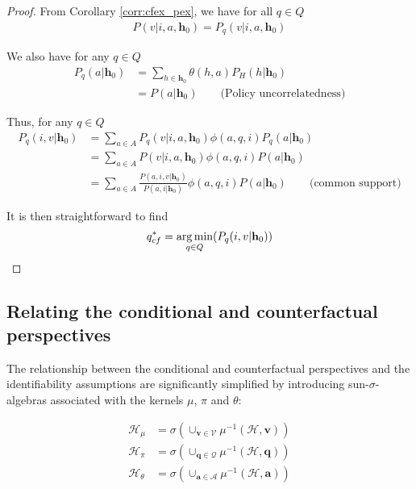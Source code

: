 \begin{proof}

From Corollary \ref{corr:cfex_pex}, we have for all $q\in Q$
\begin{align}
    P(v|i,a,\mathbf{h}_0) = P_{q}(v|i,a,\mathbf{h}_0) \label{eq:cfex}
\end{align}

We also have for any $q\in Q$
\begin{align}
    P_q(a|\mathbf{h}_0) &= \sum_{h\in \mathbf{h}_0} \theta(h,a) P_H(h|\mathbf{h}_0) \nonumber\\
               &= P(a|\mathbf{h}_0)\qquad \text{(Policy uncorrelatedness)} \label{eq:cfun}
\end{align}

Thus, for any $q\in Q$
\begin{align}
    P_q(i,v|\mathbf{h}_0) &= \sum_{a\in A} P_q(v|i,a,\mathbf{h}_0) \phi(a,q,i) P_q(a|\mathbf{h}_0) \\
                 &= \sum_{a\in A} P(v|i,a,\mathbf{h}_0) \phi(a,q,i) P(a|\mathbf{h}_0) \\
                 &= \sum_{a\in A} \frac{P(a,i,v|\mathbf{h}_0)}{P(a,i|\mathbf{h}_0)} \phi(a,q,i) P(a|\mathbf{h}_0) \qquad\text{(common support)}
\end{align}

It is then straightforward to find
\begin{align}
    q^*_{cf} = \operatorname*{arg\,min}_{q\in Q} (P_q(i,v|\mathbf{h}_0))
\end{align}
\end{proof}

\subsection{Relating the conditional and counterfactual perspectives}

The relationship between the conditional and counterfactual perspectives and the identifiability assumptions are significantly simplified by introducing sun-$\sigma$-algebras associated with the kernels $\mu$, $\pi$ and $\theta$:

\begin{align}
    \mathcal{H}_\mu &= \sigma(\cup_{\mathbf{v}\in \mathcal{V}} \mu^{-1}(\mathcal{H},\mathbf{v}))\\
    \mathcal{H}_\pi &= \sigma(\cup_{\mathbf{q}\in \mathcal{Q}} \mu^{-1}(\mathcal{H},\mathbf{q}))\\
    \mathcal{H}_\theta &= \sigma(\cup_{\mathbf{a}\in \mathcal{A}} \mu^{-1}(\mathcal{H},\mathbf{a}))\\
\end{align}

